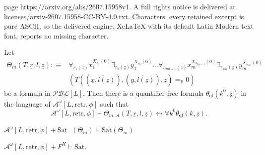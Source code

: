 \documentclass[10pt,a4paper]{amsart}
\def\RR{\mathbb{R}}
\begin{document}
page https://arxiv.org/abs/2607.15958v1. A full rights notice is delivered at licenses/arxiv-2607.15958-CC-BY-4.0.txt. Characters: every retained excerpt is pure ASCII, so the delivered engine, XeLaTeX with its default Latin Modern text font, reports no missing character.
\begin{proposition}
\label{prop:approx:univ}
Let
\begin{align*}
    \Theta_m(T,\underline{r},l,\underline{z}):\equiv &\forall_{r_1(\underline{z})} x_1^{X_{s_1}(0)} \exists_{r_2(\underline{z})} y_1^{X_{s_2}(0)} \ldots \forall_{r_{2m-1}(\underline{z})} x_m^{X_{s_{2m-1}}(0)}\exists_{r_{2m}(\underline{z})} y_m^{X_{s_{2m}}(0)}\\&(T((\overline{\underline{x},l(\underline{z})}),(\overline{\underline{y},l(\underline{z})}),\underline{z})=_\RR 0)
\end{align*}
be a formula in $\mathcal{PBL}[L]$. Then there is a quantifier-free formula $\theta_\mathrm{qf}(k^0,\underline{z})$ in the language of  $\mathcal{A}^\omega[L,\mathrm{retr},\phi]$ such that
\[
\mathcal{A}^\omega[L,\mathrm{retr},\phi]\vdash \Theta_{m,\mathcal{A}}(T,\underline{r},l,\underline{z}) \leftrightarrow \forall k^0\theta_\mathrm{qf}(k,\underline{z}).
\]
\end{proposition}

\begin{proposition}
\label{prop:sat:int:to}
    $\mathcal{A}^\omega[L,\mathrm{retr},\phi]+\mathrm{Sat}_{-}(\Theta_m) \vdash \mathrm{Sat}(\Theta_m) $ 
\end{proposition}

\begin{proposition}
\label{prop:F:to:sat}
 $\mathcal{A}^\omega[L,\mathrm{retr},\phi]+F^X \vdash\mathrm{Sat}$.    
\end{proposition}
\end{document}

